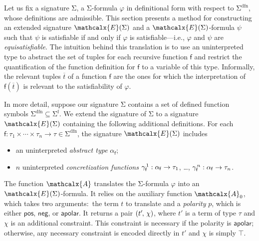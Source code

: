 \documentclass[runningheads,a4paper]{llncs}
\newcommand{\con}[1]{\mathsf{#1}}
\renewcommand\vec[1]{\overline{#1}}
\let\oldSigma=\Sigma
\def\Sigma{\mathrm{\oldSigma}}
\newcommand{\conv}{\mathcalx{A}}
\newcommand{\sfuns}[1]{#1^\mathrm{f}}
\newcommand{\sfundefs}[1]{#1^\mathrm{dfn}}
\newcommand{\pnone}{\con{apolar}}
\newcommand{\ppos}{\con{pos}}
\newcommand{\pneg}{\con{neg}}
\newcommand{\ltrue}{\top}
\newcommand\concret{\gamma} %
\newcommand{\farg}[1]{\concret_{#1}}
\newcommand{\fargx}[2]{\concret^{\vthinspace#2}_{#1}}
\newcommand{\fargsort}[1]{\alpha_{#1}}
\newcommand{\extendsig}[1]{\mathcalx{E}( #1 )}
\newcommand{\negvthinspace}{\kern-0.083333em}
\newcommand{\vthinspace}{\kern+0.083333em}
\begin{document}
Let us fix a signature $\Sigma$, a $\Sigma$-formula
$\varphi$ in definitional form with respect to $\sfundefs{\Sigma}$,
whose definitions are admissible.
This section presents a method for constructing an extended signature
$\extendsig{ \Sigma }$ and a $\extendsig{ \Sigma }$-formula $\psi$ such that
$\psi$ is satisfiable if and only if $\varphi$ is satisfiable---i.e.,
$\varphi$ and $\psi$ are \emph{equisatisfiable}.
The intuition behind this translation
is to use an uninterpreted type to abstract the set of
 tuples for each recursive function $\con{f}$ and restrict the
quantification of the function definition for $\con{f}$ to a variable of this
type. Informally, the relevant tuples $\vec t$ of a function $\con{f}$ are the
ones for which the interpretation of $\con{f}( \vec t )$ is relevant to the
satisfiability of $\varphi$.

In more detail,
suppose our signature $\Sigma$ contains a set of defined function symbols $\sfundefs{\Sigma} \subseteq \sfuns{\Sigma}$.
We extend the signature of $\Sigma$ to a signature $\extendsig{\Sigma}$ containing the following additional definitions.
For each $\con{f} : \tau_1 \times \cdots \times \tau_n \rightarrow \tau \in \sfundefs{\Sigma}$,
the signature $\extendsig{\Sigma}$ includes
\begin{itemize}
\item an uninterpreted \emph{abstract type} $\fargsort{\con{f}}$;
\item $n$ uninterpreted \emph{concretization functions} $\fargx{\con{f}}{1} : \fargsort{\con{f}} \rightarrow \tau_1$, \ldots, $\fargx{\con{f}}{n} : \fargsort{\con{f}} \rightarrow \tau_n$.
\end{itemize}

The function $\conv$ translates the $\Sigma$-formula
$\varphi$ into an $\extendsig{\Sigma}$-formula. It relies
on the auxiliary function $\conv_0$, which takes two arguments:\ the term $t$
to translate and a \emph{polarity} $p$, which is either $\ppos$, $\pneg$, or
$\pnone$. It returns a pair $( t'\negvthinspace,\, \chi )$, where $t'$ is a term of
type $\tau$ and $\chi$ is an additional constraint.
This constraint is necessary if the polarity is $\pnone$; otherwise, any necessary
constraint is encoded directly in $t'$ and $\chi$ is simply $\ltrue$.
\end{document}
